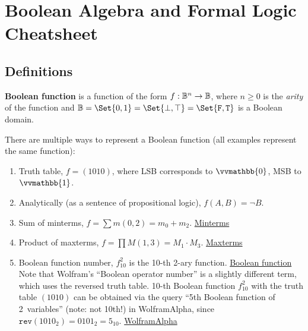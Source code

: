 \documentclass[a4paper,10pt]{article}
\begin{document}

\setcounter{section}{2}
\section{Boolean Algebra and Formal Logic Cheatsheet}

\subsection{Definitions}

\begin{terms}
    \item \raggedright \textbf{Boolean function} is a function of the form $f: \mathbb{B}^n \to \mathbb{B}$, where $n \geq 0$ is the \emph{arity} of the function and $\Bool =\nobreak \Set{0, 1} =\nobreak \Set{\bot, \top} =\nobreak \Set{\texttt{F}, \texttt{T}}$ is a Boolean domain.

    \item There are multiple ways to represent a Boolean function (all examples represent the same function):

    \begin{enumerate}[left=6pt .. 18pt]
        \item Truth table, \eg $f = (1010)$, where LSB corresponds to $\vvmathbb{0}$, MSB to $\vvmathbb{1}$.

        \item Analytically (as a sentence of propositional logic), \eg $f(A,B) = \neg B$.

        \item Sum of minterms, \eg $f = \sum m(0,2) = m_0 + m_2$.
        \hfill\href{http://www.cs.ucr.edu/~ehwang/courses/cs120a/minterms.pdf}{Minterms}

        \item Product of maxterms, \eg $f = \prod M(1,3) = M_1 \cdot M_3$.
        \hfill\href{http://www.cs.ucr.edu/~ehwang/courses/cs120a/minterms.pdf#page=2}{Maxterms}

        \item Boolean function number, \eg $f^{2}_{10}$ is the 10-th 2-ary function.
        \hfill\href{https://mathworld.wolfram.com/BooleanFunction.html}{Boolean function} \\
        Note that Wolfram's \enquote{Boolean operator number} is a slightly different term, which uses the reversed truth table. 10-th Boolean function $f^{2}_{10}$ with the truth table $(1010)$ can be obtained via the query \enquote{5th Boolean function of 2~variables} (note: not 10th!) in WolframAlpha, since $\texttt{rev}(1010_2) = 0101_2 = 5_{10}$.
        \hfill\href{https://bit.ly/3nFbad5}{WolframAlpha}


\end{enumerate}
\end{terms}
\end{document}
